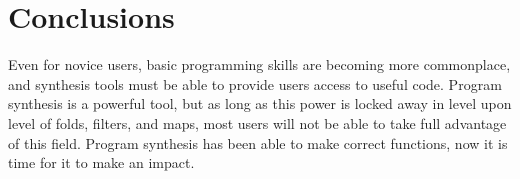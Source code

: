 \section{Conclusions}
\label{conclusions}

Even for novice users, basic programming skills are becoming more commonplace, and synthesis tools must be able to provide users access to useful code. 
Program synthesis is a powerful tool, but as long as this power is locked away in level upon level of folds, filters, and maps, most users will not be able to take full advantage of this field. 
Program synthesis has been able to make correct functions, now it is time for it to make an impact.